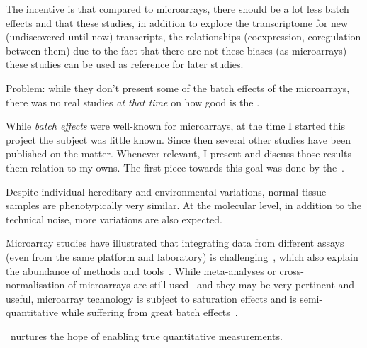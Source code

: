 The incentive is that compared to microarrays, there should be a lot less
batch effects and that these studies, in addition to explore the transcriptome
for new (undiscovered until now) transcripts, the relationships (coexpression,
coregulation between them) due to the fact that there are not these biases (as
microarrays) these studies can be used as reference for later studies.


Problem: while they don't present some of the batch effects of the microarrays,
there was no real studies \emph{at that time} on how good is the \Rnaseq.

While \emph{batch effects} were well-known for microarrays,
at the time I started this project
the subject was little known.
Since then several other studies have been published on the matter.
Whenever relevant, I present and discuss those results them relation to my owns.
The first piece towards this goal was done by the~.

\begin{comment}
Normal tissues sampled from various people are phenotypically very similar,
despite individual hereditary and environmental variations.
At molecular level,
technical noise, batch effects and physical limitations
are also generating variations.
\end{comment}


Despite individual hereditary and environmental variations,
normal tissue samples are phenotypically very similar.
At the molecular level, in addition to the technical noise,
more variations are also expected.

Microarray studies have illustrated that integrating data
from different assays (even from the same platform and laboratory)
is challenging~,
which also explain the abundance of methods and tools~.
While meta-analyses or cross-normalisation of microarrays are still
used~ and they may be very pertinent and
useful,
microarray technology is subject to saturation effects and is semi-quantitative
while suffering from great batch effects~.

\Rnaseq\ nurtures the hope of enabling true quantitative measurements.


